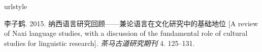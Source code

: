 \begin{thebibliography}{1}
\providecommand{\natexlab}[1]{#1}
\providecommand{\url}[1]{#1}
\providecommand{\urlprefix}{}
\expandafter\ifx\csname urlstyle\endcsname\relax
\providecommand{\doi}[1]{doi:\discretionary{}{}{}#1}\else
\providecommand{\doi}{doi:\discretionary{}{}{}\begingroup
\urlstyle{rm}\Url}\fi

李子鹤. 2015.
\newblock
  纳西语言研究回顾------兼论语言在文化研究中的基础地位
  [{A} review of {Naxi} language studies, with a discussion of the fundamental
  role of cultural studies for linguistic research].
\newblock \emph{茶马古道研究期刊} 4. 125--131.

\end{thebibliography}
